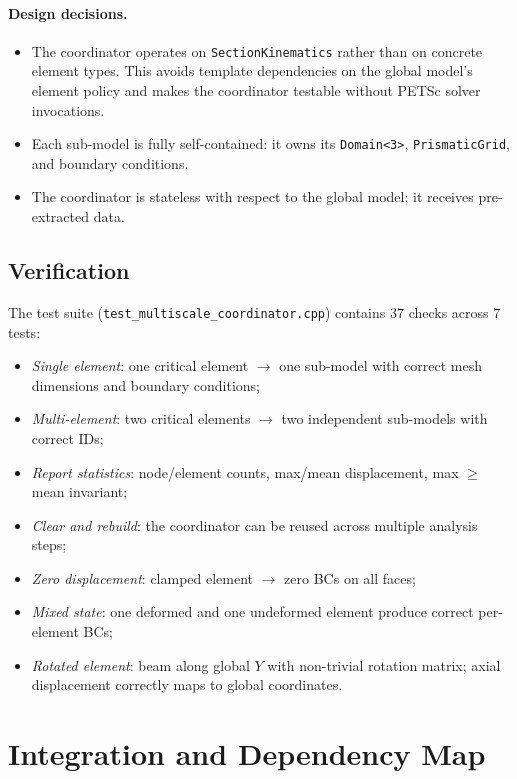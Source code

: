 \paragraph{Design decisions.}
\begin{itemize}
  \item The coordinator operates on \texttt{SectionKinematics} rather
    than on concrete element types.  This avoids template dependencies on
    the global model's element policy and makes the coordinator testable
    without PETSc solver invocations.
  \item Each sub-model is fully self-contained: it owns its
    \texttt{Domain<3>}, \texttt{PrismaticGrid}, and boundary conditions.
  \item The coordinator is stateless with respect to the global model;
    it receives pre-extracted data.
\end{itemize}

\subsection{Verification}

The test suite (\texttt{test\_multiscale\_coordinator.cpp}) contains 37
checks across 7 tests:
\begin{itemize}
  \item \emph{Single element}: one critical element $\to$ one sub-model
    with correct mesh dimensions and boundary conditions;
  \item \emph{Multi-element}: two critical elements $\to$ two independent
    sub-models with correct IDs;
  \item \emph{Report statistics}: node/element counts, max/mean
    displacement, max $\geq$ mean invariant;
  \item \emph{Clear and rebuild}: the coordinator can be reused across
    multiple analysis steps;
  \item \emph{Zero displacement}: clamped element $\to$ zero BCs on all
    faces;
  \item \emph{Mixed state}: one deformed and one undeformed element
    produce correct per-element BCs;
  \item \emph{Rotated element}: beam along global $Y$ with non-trivial
    rotation matrix; axial displacement correctly maps to global
    coordinates.
\end{itemize}


\section{Integration and Dependency Map}
\label{sec:dependency_map}

